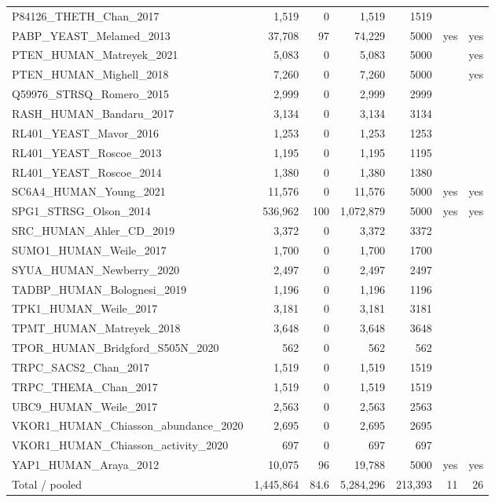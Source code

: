 \documentclass[11pt,a4paper]{article}
\begin{document}
\begin{table}[H]
\begin{tabular}{lrrrrrr}
P84126\_THETH\_Chan\_2017 & 1,519 & 0 & 1,519 & 1519 &  &  \\
PABP\_YEAST\_Melamed\_2013 & 37,708 & 97 & 74,229 & 5000 & yes & yes \\
PTEN\_HUMAN\_Matreyek\_2021 & 5,083 & 0 & 5,083 & 5000 &  & yes \\
PTEN\_HUMAN\_Mighell\_2018 & 7,260 & 0 & 7,260 & 5000 &  & yes \\
Q59976\_STRSQ\_Romero\_2015 & 2,999 & 0 & 2,999 & 2999 &  &  \\
RASH\_HUMAN\_Bandaru\_2017 & 3,134 & 0 & 3,134 & 3134 &  &  \\
RL401\_YEAST\_Mavor\_2016 & 1,253 & 0 & 1,253 & 1253 &  &  \\
RL401\_YEAST\_Roscoe\_2013 & 1,195 & 0 & 1,195 & 1195 &  &  \\
RL401\_YEAST\_Roscoe\_2014 & 1,380 & 0 & 1,380 & 1380 &  &  \\
SC6A4\_HUMAN\_Young\_2021 & 11,576 & 0 & 11,576 & 5000 & yes & yes \\
SPG1\_STRSG\_Olson\_2014 & 536,962 & 100 & 1,072,879 & 5000 & yes & yes \\
SRC\_HUMAN\_Ahler\_CD\_2019 & 3,372 & 0 & 3,372 & 3372 &  &  \\
SUMO1\_HUMAN\_Weile\_2017 & 1,700 & 0 & 1,700 & 1700 &  &  \\
SYUA\_HUMAN\_Newberry\_2020 & 2,497 & 0 & 2,497 & 2497 &  &  \\
TADBP\_HUMAN\_Bolognesi\_2019 & 1,196 & 0 & 1,196 & 1196 &  &  \\
TPK1\_HUMAN\_Weile\_2017 & 3,181 & 0 & 3,181 & 3181 &  &  \\
TPMT\_HUMAN\_Matreyek\_2018 & 3,648 & 0 & 3,648 & 3648 &  &  \\
TPOR\_HUMAN\_Bridgford\_S505N\_2020 & 562 & 0 & 562 & 562 &  &  \\
TRPC\_SACS2\_Chan\_2017 & 1,519 & 0 & 1,519 & 1519 &  &  \\
TRPC\_THEMA\_Chan\_2017 & 1,519 & 0 & 1,519 & 1519 &  &  \\
UBC9\_HUMAN\_Weile\_2017 & 2,563 & 0 & 2,563 & 2563 &  &  \\
VKOR1\_HUMAN\_Chiasson\_abundance\_2020 & 2,695 & 0 & 2,695 & 2695 &  &  \\
VKOR1\_HUMAN\_Chiasson\_activity\_2020 & 697 & 0 & 697 & 697 &  &  \\
YAP1\_HUMAN\_Araya\_2012 & 10,075 & 96 & 19,788 & 5000 & yes & yes \\
\midrule
Total / pooled & 1,445,864 & 84.6 & 5,284,296 & 213,393 & 11 & 26 \\
\bottomrule
\end{tabular}
\end{table}
\end{document}
